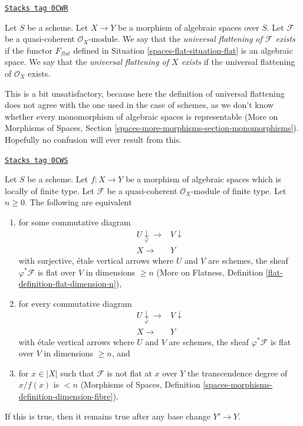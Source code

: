 \begin{definition}[Flattening]
\label{spaces-flat-definition-flattening}
\href{https://stacks.math.columbia.edu/tag/0CWR}{\texttt{Stacks tag 0CWR}}

Let $S$ be a scheme.
Let $X \to Y$ be a morphism of algebraic spaces over $S$.
Let $\mathcal{F}$ be a quasi-coherent $\mathcal{O}_X$-module.
We say that the {\it universal flattening of $\mathcal{F}$ exists}
if the functor $F_{flat}$ defined in Situation \ref{spaces-flat-situation-flat}
is an algebraic space.
We say that the {\it universal flattening of $X$ exists}
if the universal flattening of $\mathcal{O}_X$ exists.
\end{definition}

This is a bit unsatisfactory, because here the definition of
universal flattening does not agree with the one used in the
case of schemes, as we don't know whether every monomorphism of
algebraic spaces is representable (More on Morphisms of Spaces,
Section \ref{spaces-more-morphisms-section-monomorphisms}).
Hopefully no confusion will ever result from this.

\begin{lemma}
\label{spaces-flat-lemma-pre-flat-dimension-n}
\href{https://stacks.math.columbia.edu/tag/0CWS}{\texttt{Stacks tag 0CWS}}

Let $S$ be a scheme.
Let $f : X \to Y$ be a morphism of algebraic spaces which is
locally of finite type.
Let $\mathcal{F}$ be a quasi-coherent $\mathcal{O}_X$-module of finite
type. Let $n \geq 0$. The following are equivalent
\begin{enumerate}
\item for some commutative diagram
$$
\begin{array}{cc}U \underset{\varphi}{\downarrow}\longrightarrow & V \downarrow \\ X \longrightarrow & Y\end{array}
$$
with surjective, \'etale vertical arrows where $U$ and $V$ are
schemes, the sheaf $\varphi^*\mathcal{F}$ is flat over $V$
in dimensions $\geq n$ (More on Flatness, Definition
\ref{flat-definition-flat-dimension-n}),
\item for every commutative diagram
$$
\begin{array}{cc}U \underset{\varphi}{\downarrow}\longrightarrow & V \downarrow \\ X \longrightarrow & Y\end{array}
$$
with \'etale vertical arrows where $U$ and $V$ are schemes,
the sheaf $\varphi^*\mathcal{F}$ is flat over $V$ in dimensions $\geq n$, and
\item for $x \in |X|$ such that $\mathcal{F}$ is not flat at $x$
over $Y$ the transcendence degree of $x/f(x)$ is $< n$ (Morphisms of Spaces,
Definition \ref{spaces-morphisms-definition-dimension-fibre}).
\end{enumerate}
If this is true, then it remains true after any base change $Y' \to Y$.
\end{lemma}

